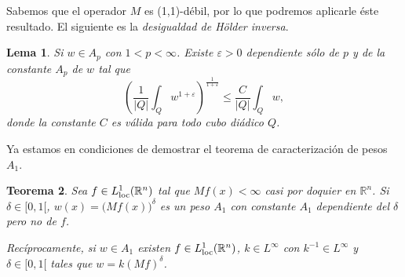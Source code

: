 \documentclass[12pt,english]{article}
\newtheorem{theorem}{Teorema}
\newtheorem{lemma}[theorem]{Lema}
\theoremstyle{definition}
\theoremstyle{remark}
\begin{document}
Sabemos que el operador $M$ es (1,1)-débil, por lo que podremos aplicarle éste resultado. El siguiente es la \emph{desigualdad de Hölder inversa}.

\begin{lemma} \label{lm: inverse holder} Si $w\in A_p$ con $1<p<\infty$. Existe $\varepsilon>0$ dependiente sólo de $p$ y de la constante $A_p$ de $w$ tal que
	\[\left(\frac{1}{|Q|}\int_Q w^{1+\varepsilon}\right)^{\frac{1}{1+\varepsilon}}\leq \frac{C}{|Q|}\int_Q w,\]
	donde la constante $C$ es válida para todo cubo diádico $Q$.
\end{lemma}

Ya estamos en condiciones de demostrar el teorema de caracterización de pesos $A_1$.

\begin{theorem}\label{thm: A1 characterization} Sea $f\in L^1_{\rm loc}(\mathbb{R}^n)$ tal que $Mf(x)<\infty$ casi por doquier en $\mathbb{R}^n$. Si $\delta\in[0,1[$, $w(x)=\big(Mf(x)\big)^\delta$ es un peso $A_1$ con constante $A_1$ dependiente del $\delta$ pero no de $f$.
	
Recíprocamente, si $w\in A_1$ existen $f\in L^1_{\rm loc}(\mathbb{R}^n)$, $k\in L^\infty$ con $k^{-1}\in L^\infty$ y $\delta\in[0,1[$ tales que $w=k(Mf)^\delta$.
\end{theorem}
\end{document}
